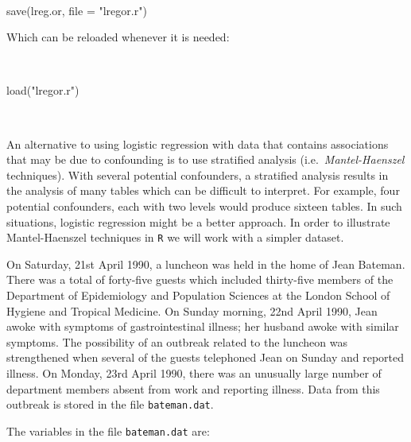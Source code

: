 \documentclass[
  12pt,
  a4paper]{book}
\newenvironment{Shaded}{\begin{snugshade}}{\end{snugshade}}
\newcommand{\AttributeTok}[1]{\textcolor[rgb]{0.77,0.63,0.00}{#1}}
\newcommand{\FunctionTok}[1]{\textcolor[rgb]{0.00,0.00,0.00}{#1}}
\newcommand{\NormalTok}[1]{#1}
\newcommand{\StringTok}[1]{\textcolor[rgb]{0.31,0.60,0.02}{#1}}
\begin{document}
~

\begin{Shaded}
\begin{Highlighting}[]
\FunctionTok{save}\NormalTok{(lreg.or, }\AttributeTok{file =} \StringTok{"lregor.r"}\NormalTok{)}
\end{Highlighting}
\end{Shaded}

\newpage

Which can be reloaded whenever it is needed:

~

\begin{Shaded}
\begin{Highlighting}[]
\FunctionTok{load}\NormalTok{(}\StringTok{"lregor.r"}\NormalTok{)}
\end{Highlighting}
\end{Shaded}

~

An alternative to using logistic regression with data that contains associations that may be due to confounding is to use stratified analysis (i.e.~\emph{Mantel-Haenszel} techniques). With several potential confounders, a stratified analysis results in the analysis of many tables which can be difficult to interpret. For example, four potential confounders, each with two levels would produce sixteen tables. In such situations, logistic regression might be a better approach. In order to illustrate Mantel-Haenszel techniques in \texttt{R} we will work with a simpler dataset.

On Saturday, 21st April 1990, a luncheon was held in the home of Jean Bateman. There was a total of forty-five guests which included thirty-five members of the Department of Epidemiology and Population Sciences at the London School of Hygiene and Tropical Medicine. On Sunday morning, 22nd April 1990, Jean awoke with symptoms of gastrointestinal illness; her husband awoke with similar symptoms. The possibility of an outbreak related to the luncheon was strengthened when several of the guests telephoned Jean on Sunday and reported illness. On Monday, 23rd April 1990, there was an unusually large number of department members absent from work and reporting illness. Data from this outbreak is stored in the file \texttt{bateman.dat}.

The variables in the file \texttt{bateman.dat} are:

~
\end{document}
